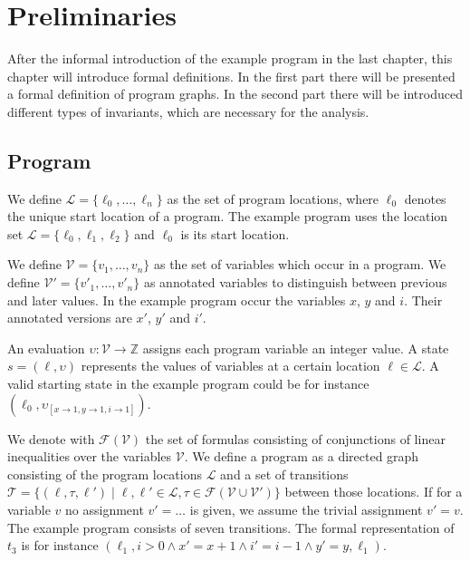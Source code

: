 \section{Preliminaries}
\label{sec:preliminaries}

After the informal introduction of the example program in the last chapter, this chapter will introduce formal definitions.
In the first part there will be presented a formal definition of program graphs.
In the second part there will be introduced different types of invariants, which are necessary for the analysis.

\subsection{Program}

We define $\mathcal{L} = \lbrace \ell_0, \dots, \ell_n \rbrace$ as the set of program locations, where $\ell_0$ denotes the unique start location of a program.
The example program uses the location set $\mathcal{L} = \lbrace \ell_0 , \ell_1 , \ell_2 \rbrace$ and $\ell_0$ is its start location.

We define $\mathcal{V} = \lbrace v_1, \dots, v_n \rbrace$ as the set of variables which occur in a program.
We define $\mathcal{V}' = \lbrace v'_1, \dots, v'_n \rbrace$ as annotated variables to distinguish between previous and later values.
In the example program occur the variables $x$, $y$ and $i$.
Their annotated versions are $x'$, $y'$ and $i'$.

An evaluation $\upsilon: \mathcal{V} \rightarrow \mathbb{Z}$ assigns each program variable an integer value.
A state $s = (\ell, \upsilon)$ represents the values of variables at a certain location $\ell \in \mathcal{L}$.
A valid starting state in the example program could be for instance $(\ell_0, \upsilon_{[x \rightarrow 1, y \rightarrow 1, i \rightarrow 1]})$.

We denote with $\mathcal{F}(\mathcal{V})$ the set of formulas consisting of conjunctions of linear inequalities over the variables $\mathcal{V}$.
We define a program as a directed graph consisting of the program locations $\mathcal{L}$ and a set of transitions $\mathcal{T} = \lbrace (\ell, \tau, \ell') \mid \ell, \ell' \in \mathcal{L}, \tau \in \mathcal{F}(\mathcal{V} \cup \mathcal{V}') \rbrace$ between those locations.
If for a variable $v$ no assignment $v' = \dots$ is given, we assume the trivial assignment $v' = v$.
The example program consists of seven transitions. The formal representation of $t_3$ is for instance $(\ell_1, i > 0 \wedge x' = x + 1 \wedge i' = i - 1 \wedge y' = y,\ell_1)$.

